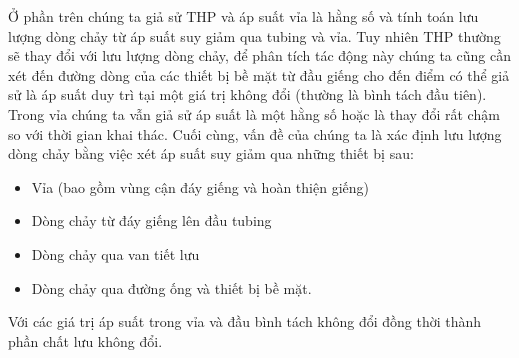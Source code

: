 \documentclass[12pt,a4paper]{report}
\begin{document}
Ở phần trên chúng ta giả sử THP và áp suất vỉa là hằng số và tính toán lưu lượng dòng chảy từ áp suất suy giảm qua tubing và vỉa. Tuy nhiên THP thường sẽ thay đổi với lưu lượng dòng chảy, để phân tích tác động này chúng ta cũng cần xét đến đường dòng của các thiết bị bề mặt từ đầu giếng cho đến điểm có thể giả sử là áp suất duy trì tại một giá trị không đổi (thường là bình tách đầu tiên). Trong vỉa chúng ta vẫn giả sử áp suất là một hằng số hoặc là thay đổi rất chậm so với thời gian khai thác. Cuối cùng, vấn đề của chúng ta là xác định lưu lượng dòng chảy bằng việc xét áp suất suy giảm qua những thiết bị sau:
	\begin{itemize}
		\item Vỉa (bao gồm vùng cận đáy giếng và hoàn thiện giếng)
		\item Dòng chảy từ đáy giếng lên đầu tubing
		\item Dòng chảy qua van tiết lưu
		\item Dòng chảy qua đường ống và thiết bị bề mặt.
	\end{itemize}
Với các giá trị áp suất trong vỉa và đầu bình tách không đổi đồng thời thành phần chất lưu không đổi.
\end{document}
